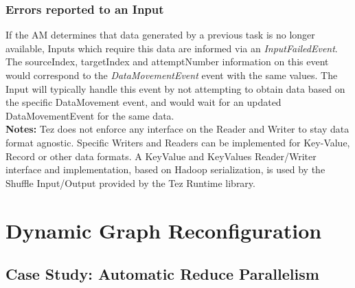 \documentclass[twocolumn]{article}
\begin{document}
\subsubsection*{Errors reported to an Input} 
If the AM determines
that data generated by a previous task is no longer available, Inputs
which require this data are informed via an \textit{InputFailedEvent}. The
sourceIndex, targetIndex and attemptNumber information on this event
would correspond to the \textit{DataMovementEvent} event with the same values.
The Input will typically handle this event by not attempting to obtain
data based on the specific DataMovement event, and would wait for an
updated DataMovementEvent for the same data.
\\
\textbf{Notes:} Tez does not enforce any interface on the Reader and Writer to stay data format agnostic. Specific Writers and
Readers can be implemented for Key-Value, Record or other data formats.
A KeyValue and KeyValues Reader/Writer interface and implementation,
based on Hadoop serialization, is used by the Shuffle Input/Output
provided by the Tez Runtime library.

\section{Dynamic Graph Reconfiguration}
\subsection{Case Study: Automatic Reduce Parallelism}
%
%
\end{document}

